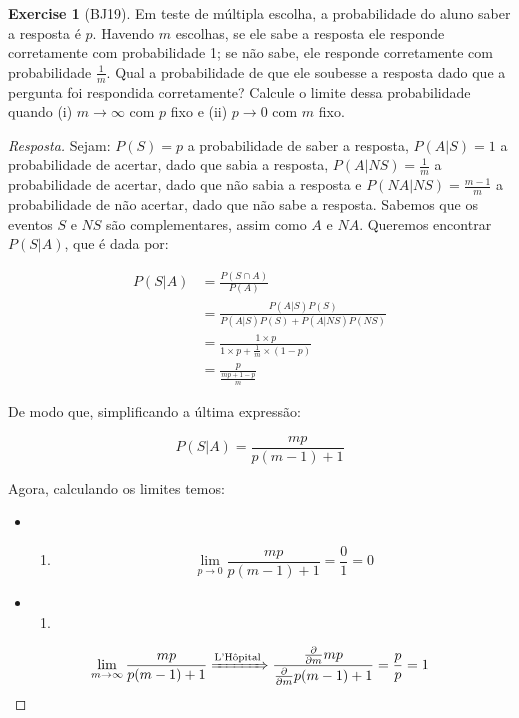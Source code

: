 \documentclass[
]{article}
\providecommand{\tightlist}{%
  \setlength{\itemsep}{0pt}\setlength{\parskip}{0pt}}
\theoremstyle{definition}
\theoremstyle{definition}
\theoremstyle{definition}
\newtheorem{exercise}{Exercise}[section]
\theoremstyle{definition}
\theoremstyle{remark}
\begin{document}
\begin{exercise}[BJ19]

Em teste de múltipla escolha, a probabilidade do aluno saber a resposta é \(p\). Havendo \(m\) escolhas, se ele sabe a resposta ele responde corretamente com probabilidade 1; se não sabe, ele responde corretamente com probabilidade \(\frac{1}{m}\). Qual a probabilidade de que ele soubesse a resposta dado que a pergunta foi respondida corretamente? Calcule o limite dessa probabilidade quando (i) \(m \to \infty\) com \(p\) fixo e (ii) \(p \to 0\) com \(m\) fixo.

\begin{proof}[Resposta]
Sejam: \(P(S) = p\) a probabilidade de saber a resposta, \(P(A|S) = 1\) a probabilidade de acertar, dado que sabia a resposta, \(P(A|NS) = \frac{1}{m}\) a probabilidade de acertar, dado que não sabia a resposta e \(P(NA|NS) = \frac{m-1}{m}\) a probabilidade de não acertar, dado que não sabe a resposta. Sabemos que os eventos \(S\) e \(NS\) são complementares, assim como \(A\) e \(NA\). Queremos encontrar \(P(S|A)\), que é dada por:

\begin{align*}
P(S|A) &= \frac{P(S \cap A)}{P(A)} \\
&= \frac{P(A|S) P(S)}{P(A|S)P(S) + P(A|NS)P(NS)} \\
&= \frac{1 \times p}{1 \times p + \frac{1}{m} \times (1-p)} \\
&= \frac{p}{\frac{mp + 1 - p}{m}}
\end{align*}

De modo que, simplificando a última expressão:

\begin{equation}
P(S|A) = \frac{mp}{p(m-1)+1}
\label{eq:pdesdadoa}
\end{equation}

Agora, calculando os limites temos:

\begin{itemize}
\item
  \begin{enumerate}
  \def\labelenumi{(\roman{enumi})}
  \tightlist
  \item
    \begin{equation*}
    \lim_{p \to 0} \frac{mp}{p(m-1)+1} = \frac{0}{1} = 0
    \end{equation*}
  \end{enumerate}
\item
  \begin{enumerate}
  \def\labelenumi{(\roman{enumi})}
  \setcounter{enumi}{1}
  \tightlist
  \item
  \end{enumerate}
\end{itemize}

\begin{equation*}
\lim_{m \to \infty} \frac{mp}{p(m-1)+1} \xRightarrow{\text{L'Hôpital}} \frac{\frac{\partial}{\partial m}mp}{\frac{\partial}{\partial m}p(m-1)+1} = \frac{p}{p} = 1
\end{equation*}
\end{proof}

\end{exercise}
\end{document}

